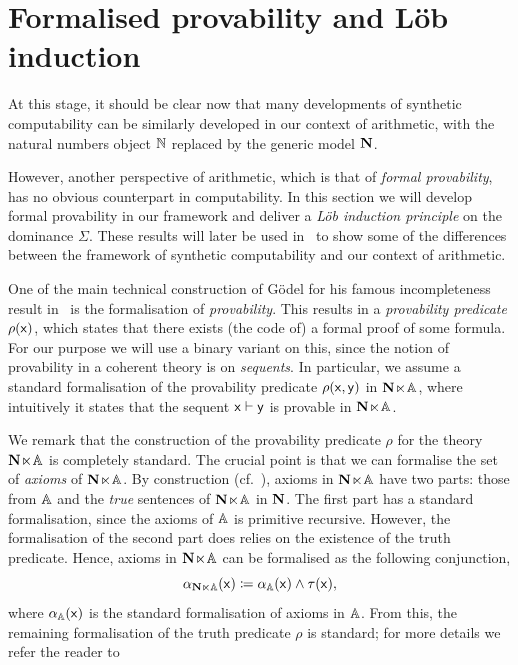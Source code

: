 \section{Formalised provability and L\"ob induction}

At this stage, it should be clear now that many developments of synthetic computability can be similarly developed in our context of arithmetic, with the natural numbers object $\mathbb{N}$ replaced by the generic model $\mathbf N$. 

However, another perspective of arithmetic, which is that of \emph{formal provability}, has no obvious counterpart in computability. In this section we will develop formal provability in our framework and deliver a \emph{L\"ob induction principle} on the dominance $\Sigma$. These results will later be used in~ to show some of the differences between the framework of synthetic computability and our context of arithmetic.

One of the main technical construction of G\"odel for his famous incompleteness result in~\citet{godel_uber_1931} is the formalisation of \emph{provability}. This results in a \emph{provability predicate} $\rho(\mathsf{x})$, which states that there exists (the code of) a formal proof of some formula. For our purpose we will use a binary variant on this, since the notion of provability in a coherent theory is on \emph{sequents}. In particular, we assume a standard formalisation of the provability predicate $\rho(\mathsf{x},\mathsf{y})$ in $\mathbf N\hspace{-.4ex}\ltimes\hspace{-.4ex}\mathbb{A}$, where intuitively it states that the sequent $\mathsf{x} \vdash \mathsf{y}$ is provable in $\mathbf N\hspace{-.4ex}\ltimes\hspace{-.4ex}\mathbb{A}$. 

\begin{remark}\label{rem:formalisationofaxioms}
  We remark that the construction of the provability predicate $\rho$ for the theory $\mathbf N\hspace{-.4ex}\ltimes\hspace{-.4ex}\mathbb{A}$ is completely standard. The crucial point is that we can formalise the set of \emph{axioms} of $\mathbf N\hspace{-.4ex}\ltimes\hspace{-.4ex}\mathbb{A}$. By construction (cf.~), axioms in $\mathbf N\hspace{-.4ex}\ltimes\hspace{-.4ex}\mathbb{A}$ have two parts: those from $\mathbb{A}$ and the \emph{true} sentences of $\mathbf N\hspace{-.4ex}\ltimes\hspace{-.4ex}\mathbb{A}$ in $\mathbf N$. The first part has a standard formalisation, since the axioms of $\mathbb{A}$ is primitive recursive. However, the formalisation of the second part does relies on the existence of the truth predicate. Hence, axioms in $\mathbf N\hspace{-.4ex}\ltimes\hspace{-.4ex}\mathbb{A}$ can be formalised as the following conjunction,
  \[ \alpha_{\mathbf N \ltimes \mathbb{A}}(\mathsf{x}) \coloneq \alpha_{\mathbb{A}}(\mathsf{x}) \wedge \tau(\mathsf{x}), \]
  where $\alpha_{\mathbb{A}}(\mathsf{x})$ is the standard formalisation of axioms in $\mathbb{A}$. From this, the remaining formalisation of the truth predicate $\rho$ is standard; for more details we refer the reader to~\citet[\S I.4.(a)]{Hájek_Pudlák_2017}
\end{remark}

